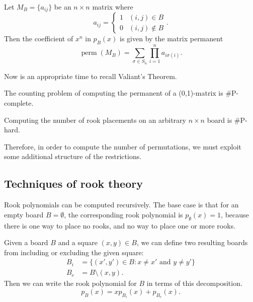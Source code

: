 \begin{lemma}
  Let $M_B = \{a_{ij}\}$ be an $n \times n$ matrix where \begin{equation}
    a_{ij} = \begin{cases}
      1 & (i,j) \in B \\
      0 & (i,j) \not\in B
    \end{cases}.
  \end{equation}
  Then the coefficient of $x^n$ in $p_B(x)$ is given by the matrix permanent
  \begin{equation}
    \operatorname{perm}(M_B) = \sum_{\sigma \in S_n} \prod_{i=1}^n a_{i\sigma(i)}.
  \end{equation}
\end{lemma}

Now is an appropriate time to recall Valiant's Theorem.

\begin{theorem}
  The counting problem of computing the permanent of a (0,1)-matrix is \#P-complete.
\end{theorem}

\begin{corollary}
  Computing the number of rook placements on an arbitrary $n \times n$ board is
  \#P-hard.
\end{corollary}

Therefore, in order to compute the number of permutations, we must exploit some
additional structure of the restrictions.

\subsection{Techniques of rook theory}
Rook polynomials can be computed recursively. The base case is that
for an empty board $B = \emptyset$, the corresponding rook polynomial is
$p_\emptyset(x) = 1$, because there is one way to place no rooks, and no way
to place one or more rooks.
\begin{lemma}
  Given a board $B$ and a square $(x,y) \in B$, we can define
  two resulting boards from including or excluding the given square:
  \begin{align}
    B_i &= \{(x',y') \in B : x \neq x' \text{ and } y \neq y'\} \\
    B_e &= B \setminus {(x,y)}.
  \end{align}
  Then we can write the rook polynomial for $B$ in terms of this decomposition.
  \begin{equation}
    p_B(x) = xp_{B_i}(x) + p_{B_e}(x).
  \end{equation}
  \label{lemma:rookPolynomialRecursion}
\end{lemma}

